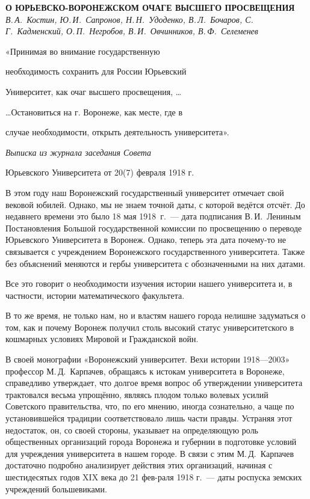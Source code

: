 \begin{center}{ \bf  О ЮРЬЕВСКО-ВОРОНЕЖСКОМ ОЧАГЕ ВЫСШЕГО ПРОСВЕЩЕНИЯ}\\
{\it В.\,А.~Костин, Ю.\,И.~Сапронов, Н.\,Н.~Удоденко, В.\,Л.~Бочаров, С.\,Г.~Кадменский, О.\,П.~Негробов, В.\,И.~Овчинников, В.\,Ф.~Селеменев
} \\
\end{center}

\begin{flushright}
«Принимая во внимание государственную

необходимость сохранить для России Юрьевский

Университет, как очаг высшего просвещения, …

…Остановиться на г. Воронеже, как месте, где в

случае необходимости, открыть деятельность университета».

{\it Выписка из журнала заседания Совета

Юрьевского Университета от 20(7) февраля 1918 г.}
\end{flushright}
В этом году наш Воронежский государственный университет отмечает свой вековой юбилей.
Однако, мы не знаем точной даты, с которой ведётся отсчёт.
До недавнего времени это было 18 мая 1918~г.~---
дата подписания В.\,И.~Лениным Постановления Большой государственной комиссии по просвещению
о переводе Юрьевского Университета в Воронеж.
Однако, теперь эта дата \linebreak почему-то не связывается с учреждением Воронежского государственного университета.
Также без объяснений меняются и гербы университета с обозначенными на них датами.

Все это говорит о необходимости изучения истории нашего университета и, в частности, истории математического факультета.

В	то же время, не только нам, но и властям нашего города нелишне задуматься о том, как и почему Воронеж получил столь высокий статус университетского в кошмарных условиях Мировой и Гражданской войн.

В	своей монографии «Воронежский университет. Вехи истории 1918—2003» профессор М.\,Д.~Карпачев, обращаясь к истокам университета в Воронеже, справедливо утверждает, что долгое время вопрос об утверждении университета трактовался весьма упрощённо, являясь плодом только волевых усилий Советского правительства, что, по его мнению, иногда сознательно, а чаще по установившейся традиции соответствовало лишь части правды. Устраняя этот недостаток, он, со своей стороны, указывает на определяющую роль общественных организаций города Воронежа и губернии в подготовке условий для учреждения университета в нашем городе. В связи с	этим М.\,Д.~Карпачев достаточно подробно анализирует действия этих организаций, начиная с шестидесятых годов XIX века до 21 фев-раля 1918 г.~--- даты роспуска земских учреждений большевиками.

